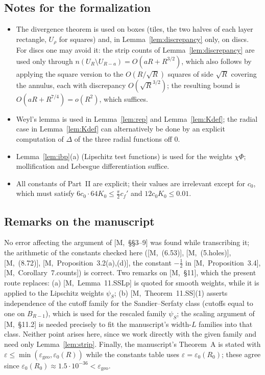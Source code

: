 \documentclass[11pt,reqno]{amsart}
\numberwithin{equation}{section}
\theoremstyle{plain}
\theoremstyle{definition}
\newcommand{\ms}[1]{\textup{[M,~#1]}}
\begin{document}
\subsection{Notes for the formalization}
\begin{itemize}
\item The divergence theorem is used on boxes (tiles, the two halves of each layer rectangle, $U_\rho$ for squares) and, in Lemma~\ref{lem:discrepancy} only, on discs.  For discs one may avoid it: the strip counts of Lemma~\ref{lem:discrepancy} are used only through $n(U_R\setminus U_{R-a})=O(aR+R^{3/2})$, which also follows by applying the square version to the $O(R/\sqrt R)$ squares of side $\sqrt R$ covering the annulus, each with discrepancy $O(\sqrt R^{3/2})$; the resulting bound is $O(aR+R^{7/4})=o(R^2)$, which suffices.
\item Weyl's lemma is used in Lemma~\ref{lem:rep} and Lemma~\ref{lem:Kdef}; the radial case in Lemma~\ref{lem:Kdef} can alternatively be done by an explicit computation of $\Delta$ of the three radial functions off $0$.
\item Lemma~\ref{lem:ibp}(a) (Lipschitz test functions) is used for the weights $\chi\Phi$; mollification and Lebesgue differentiation suffice.
\item All constants of Part~II are explicit; their values are irrelevant except for $c_0$, which must satisfy $6c_0\cdot64K_0\le\frac\pi2c_f'$ and $12c_0K_0\le0.01$.
\end{itemize}

\subsection{Remarks on the manuscript}
No error affecting the argument of \ms{\S\S3--9} was found while transcribing it; the arithmetic of the constants checked here (\ms{(6.53)}, \ms{(5.holes)}, \ms{(8.72)}, \ms{Proposition~3.2(a),(d)}, the constant $-\frac12$ in \ms{Proposition~3.4}, \ms{Corollary~7.counts}) is correct.  Two remarks on \ms{\S11}, which the present route replaces: (a) \ms{Lemma~11.SSLp} is quoted for smooth weights, while it is applied to the Lipschitz weights $\psi_S$; (b) \ms{Theorem~11.SS}(1) asserts independence of the cutoff family for the Sandier--Serfaty class (cutoffs equal to one on $B_{R-1}$), which is used for the rescaled family $\psi_S$; the scaling argument of \ms{\S11.2} is needed precisely to fit the manuscript's width-$L$ families into that class.  Neither point arises here, since we work directly with the given family and need only Lemma~\ref{lem:strip}.  Finally, the manuscript's Theorem~A is stated with $\varepsilon\le\min(\varepsilon_{\mathrm{geo}},\varepsilon_0(R))$ while the constants table uses $\varepsilon=\varepsilon_0(R_0)$; these agree since $\varepsilon_0(R_0)\approx1.5\cdot10^{-36}<\varepsilon_{\mathrm{geo}}$.
\end{document}
